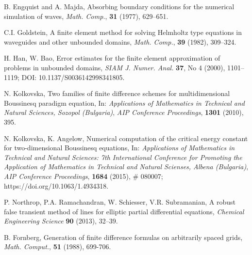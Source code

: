 \documentclass[12pt]{article}
\theoremstyle{theorem}
\theoremstyle{defi}
\begin{document}
\begin{thebibliography}{99}
 B. Engquist and A. Majda, Absorbing boundary conditions for the numerical simulation of waves, {\it Math. Comp.}, \textbf{31} (1977), 629–651.

  C.I. Goldstein, A finite element method for solving Helmholtz type equations in waveguides and other unbounded domains,
{\it Math. Comp.}, \textbf{39} (1982), 309–324.

  H. Han, W. Bao, Error estimates for the finite element approximation of problems in unbounded domains,
{\it SIAM J. Numer. Anal.} \textbf{37}, No 4 (2000), 1101–1119; DOI: 10.1137/S0036142998341805. %

 N. Kolkovska, Two families of finite difference schemes for multidimensional Boussinesq paradigm equation, In:
{\it Applications of Mathematics in Technical and Natural Sciences,  Sozopol (Bulgaria)},
\emph{AIP Conference Proceedings}, \textbf{1301} (2010), 395.

 N. Kolkovska, K. Angelow, Numerical computation of the critical energy constant for two-dimensional Boussinesq equations, In:
{\it Applications of Mathematics in Technical and Natural Sciences: 7th International Conference for Promoting the Application of Mathematics in Technical and Natural Scienses, Albena (Bulgaria)},
\emph{AIP Conference Proceedings}, \textbf{1684} (2015), \# 080007; https://doi.org/10.1063/1.4934318.

 P. Northrop, P.A. Ramachandran, W. Schiesser, V.R. Subramanian, A robust false transient method of lines for elliptic partial differential equations, {\it Chemical Engineering Science} \textbf{90} (2013), 32–39.

B. Fornberg, Generation of finite difference formulas on arbitrarily spaced grids, {\it  Math. Comput.}, \textbf{51} (1988), 699-706.
%
\end{thebibliography}
\end{document}
